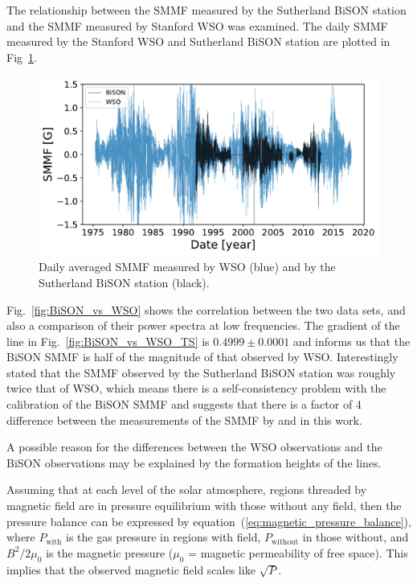 The relationship between the SMMF measured by the Sutherland BiSON station and the SMMF measured by Stanford WSO was examined. The daily SMMF measured by the Stanford WSO and Sutherland BiSON station are plotted in Fig~\ref{fig:BiSON_and_WSO}.

\begin{figure}[ht!]
    \centering
	\includegraphics[width=\columnwidth]{BiSON_and_WSO.pdf}
    \caption{Daily averaged SMMF measured by WSO (blue) and by the Sutherland BiSON station (black).}
    \label{fig:BiSON_and_WSO}
\end{figure}

Fig.~\ref{fig:BiSON_vs_WSO} shows the correlation between the two data sets, and also a comparison of their power spectra at low frequencies. The gradient of the line in Fig.~\ref{fig:BiSON_vs_WSO_TS} is $0.4999\pm0.0001$ and informs us that the BiSON SMMF is half of the magnitude of that observed by WSO. Interestingly \citet{chaplin_studies_2003} stated that the SMMF observed by the Sutherland BiSON station was roughly twice that of WSO, which means there is a self-consistency problem with the calibration of the BiSON SMMF and suggests that there is a factor of 4 difference between the measurements of the SMMF by \citet{chaplin_studies_2003} and in this work.

A possible reason for the differences between the WSO observations and the BiSON observations may be explained by the formation heights of the lines. 

Assuming that at each level of the solar atmosphere, regions threaded by magnetic field are in pressure equilibrium with those without any field, then the pressure balance can be expressed by equation~(\ref{eq:magnetic_pressure_balance}), where $P_\mathrm{with}$ is the gas pressure in regions with field, $P_\mathrm{without}$ in those without, and $B^2/2\mu_0$ is the magnetic pressure ($\mu_0$ = magnetic permeability of free space). This implies that the observed magnetic field scales like $\sqrt{P}$.

